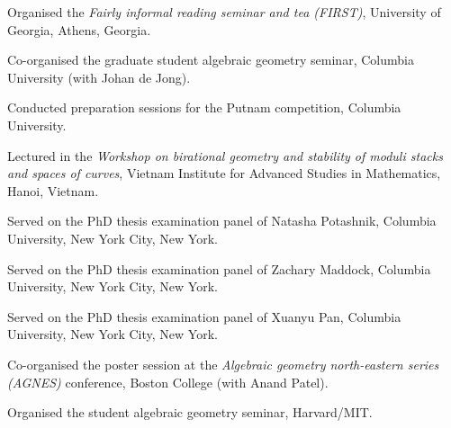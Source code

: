 \documentclass[11pt]{article}
\begin{document}
\begin{description}
Organised the \emph{Fairly informal reading seminar and tea (FIRST)}, University of Georgia, Athens, Georgia.

Co-organised the graduate student algebraic geometry seminar, Columbia University (with Johan de Jong).
\item[{2015}] Conducted preparation sessions for the Putnam competition, Columbia University.
\item[{2014}] Lectured in the \emph{Workshop on birational geometry and stability of moduli stacks and spaces of curves}, Vietnam Institute for Advanced Studies in Mathematics, Hanoi, Vietnam.
\item[{2016}] Served on the PhD thesis examination panel of Natasha Potashnik, Columbia University, New York City, New York.
\item[{2013}] Served on the PhD thesis examination panel of Zachary Maddock, Columbia University, New York City, New York.
\item[{2014}] Served on the PhD thesis examination panel of Xuanyu Pan, Columbia University, New York City, New York.
\item[{2013}] Co-organised the poster session at the \emph{Algebraic geometry north-eastern series (AGNES)} conference, Boston College (with Anand Patel).
\item[{2011, 2010}] Organised the student algebraic geometry seminar, Harvard/MIT.
\end{description}
\end{document}
